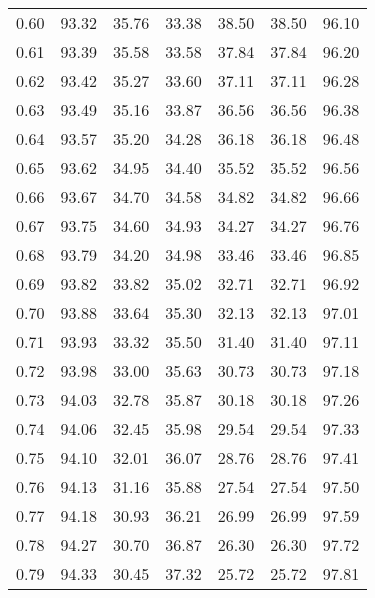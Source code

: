 \begin{tabular}{|c|c|c|c|c|c|c|}
      0.60 &     93.32 &     35.76 &      33.38 &   38.50 &      38.50 &         96.10 \\
      0.61 &     93.39 &     35.58 &      33.58 &   37.84 &      37.84 &         96.20 \\
      0.62 &     93.42 &     35.27 &      33.60 &   37.11 &      37.11 &         96.28 \\
      0.63 &     93.49 &     35.16 &      33.87 &   36.56 &      36.56 &         96.38 \\
      0.64 &     93.57 &     35.20 &      34.28 &   36.18 &      36.18 &         96.48 \\
      0.65 &     93.62 &     34.95 &      34.40 &   35.52 &      35.52 &         96.56 \\
      0.66 &     93.67 &     34.70 &      34.58 &   34.82 &      34.82 &         96.66 \\
      0.67 &     93.75 &     34.60 &      34.93 &   34.27 &      34.27 &         96.76 \\
      0.68 &     93.79 &     34.20 &      34.98 &   33.46 &      33.46 &         96.85 \\
      0.69 &     93.82 &     33.82 &      35.02 &   32.71 &      32.71 &         96.92 \\
      0.70 &     93.88 &     33.64 &      35.30 &   32.13 &      32.13 &         97.01 \\
      0.71 &     93.93 &     33.32 &      35.50 &   31.40 &      31.40 &         97.11 \\
      0.72 &     93.98 &     33.00 &      35.63 &   30.73 &      30.73 &         97.18 \\
      0.73 &     94.03 &     32.78 &      35.87 &   30.18 &      30.18 &         97.26 \\
      0.74 &     94.06 &     32.45 &      35.98 &   29.54 &      29.54 &         97.33 \\
      0.75 &     94.10 &     32.01 &      36.07 &   28.76 &      28.76 &         97.41 \\
      0.76 &     94.13 &     31.16 &      35.88 &   27.54 &      27.54 &         97.50 \\
      0.77 &     94.18 &     30.93 &      36.21 &   26.99 &      26.99 &         97.59 \\
      0.78 &     94.27 &     30.70 &      36.87 &   26.30 &      26.30 &         97.72 \\
      0.79 &     94.33 &     30.45 &      37.32 &   25.72 &      25.72 &         97.81 \\

\end{tabular}
